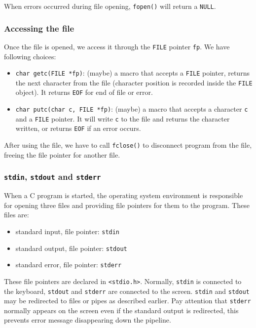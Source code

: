 \documentclass[12pt]{article}
\begin{document}
When errors occurred during file opening, \texttt{fopen()} will return a \texttt{NULL}.
\subsubsection{Accessing the file}
\label{sec:org93c4edc}
Once the file is opened, we access it through the \texttt{FILE} pointer \texttt{fp}. We have following choices:
\begin{itemize}
\item \texttt{char getc(FILE *fp)}: (maybe) a macro that accepts a \texttt{FILE} pointer, returns the next character from the file (character position is recorded inside the \texttt{FILE} object). It returns \texttt{EOF} for end of file or error.
\item \texttt{char putc(char c, FILE *fp)}: (maybe) a macro that accepts a character \texttt{c} and a \texttt{FILE} pointer. It will write \texttt{c} to the file and returns the character written, or returns \texttt{EOF} if an error occurs.
\end{itemize}

After using the file, we have to call \texttt{fclose()} to disconnect program from the file, freeing the file pointer for another file.

\subsubsection{\texttt{stdin}, \texttt{stdout} and \texttt{stderr}}
\label{sec:org08a008e}
When a C program is started, the operating system environment is responsible for opening three files and providing file pointers for them to the program. These files are:
\begin{itemize}
\item standard input, file pointer: \texttt{stdin}
\item standard output, file pointer: \texttt{stdout}
\item standard error, file pointer: \texttt{stderr}
\end{itemize}
These file pointers are declared in \texttt{<stdio.h>}. Normally, \texttt{stdin} is connected to the keyboard, \texttt{stdout} and \texttt{stderr} are connected to the screen. \texttt{stdin} and \texttt{stdout} may be redirected to files or pipes as described earlier. Pay attention that \texttt{stderr} normally appears on the screen even if the standard output is redirected, this prevents error message disappearing down the pipeline. 
\end{document}
